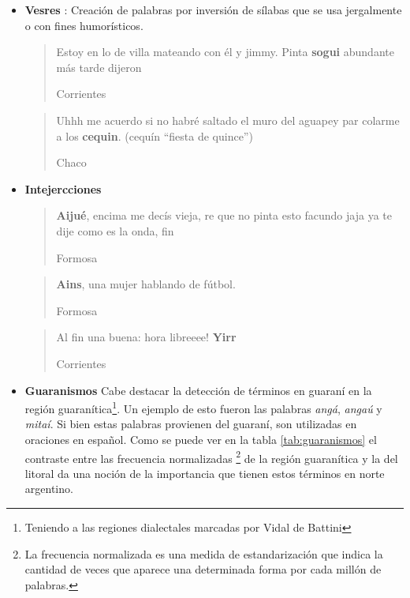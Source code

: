 \begin{itemize}
  \blockquote[Chaco]{Es lo mas lindo no ir al colegio y quedarme a tomar \textbf{teresss}}


\item \textbf{Vesres} : Creación de palabras por inversión de sílabas que se usa jergalmente o con fines humorísticos.

  \blockquote[Corrientes]{Estoy en lo de villa mateando con él y jimmy. Pinta \textbf{sogui} abundante más tarde dijeron }

  \blockquote[Chaco]{Uhhh me acuerdo si no habré saltado el muro del aguapey par colarme a los \textbf{cequin}. (cequín “fiesta de quince”)}

\item \textbf{Intejercciones}

  \blockquote[Formosa]{\textbf{Aijué}, encima me decís vieja, re que no pinta esto facundo jaja ya te dije como es la onda, fin }

  \blockquote[Formosa]{\textbf{Ains}, una mujer hablando de fútbol.}

  \blockquote[Corrientes]{Al fin una buena: hora libreeee! \textbf{Yirr} }

\item \textbf{Guaranismos}
\label{sub:guaranismos}
Cabe destacar la detección de términos en guaraní en la región  guaranítica\footnote{Teniendo a las regiones dialectales marcadas por Vidal de Battini}.
Un ejemplo de esto fueron las palabras \textit{angá}, \textit{angaú} y \textit{mitaí}.  Si bien estas palabras provienen del guaraní, son utilizadas en oraciones en español.
Como se puede ver en la tabla \ref{tab:guaranismos} el contraste entre las frecuencia normalizadas \footnote{La frecuencia normalizada es una medida de estandarización que indica la cantidad de veces que aparece una determinada forma por cada millón de palabras.} de la región guaranítica y la del litoral da una noción de la importancia que tienen estos términos en norte argentino. 

\end{itemize}


